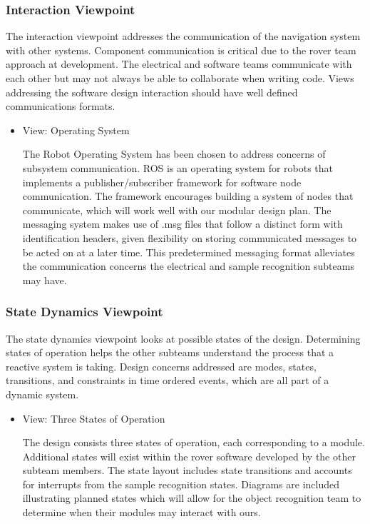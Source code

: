 \documentclass[10pt, oneside,onecolumn]{IEEEtran}
\begin{document}
\begin{titlepage}
\subsubsection{Interaction Viewpoint}

The interaction viewpoint addresses the communication of the navigation system with other systems. Component communication is critical due to the rover team approach at development. The electrical and software teams communicate with each other but may not always be able to collaborate when writing code. Views addressing the software design interaction should have well defined communications formats. 

\begin{itemize}

\item View: Operating System

The Robot Operating System has been chosen to address concerns of subsystem communication. ROS is an operating system for robots that implements a publisher/subscriber framework for software node communication. The framework encourages building a system of nodes that communicate, which will work well with our modular design plan. The messaging system makes use of .msg files that follow a distinct form with identification headers, given flexibility on storing communicated messages to be acted on at a later time. This predetermined messaging format alleviates the communication concerns the electrical and sample recognition subteams may have.
\end{itemize}

\subsubsection{State Dynamics Viewpoint}

The state dynamics viewpoint looks at possible states of the design. Determining states of operation helps the other subteams understand the process that a reactive system is taking. Design concerns addressed are modes, states, transitions, and constraints in time ordered events, which are all part of a dynamic system. 

\begin{itemize}
\item View: Three States of Operation

The design consists three states of operation, each corresponding to a module. Additional states will exist within the rover software developed by the other subteam members. The state layout includes state transitions and accounts for interrupts from the sample recognition states. Diagrams are included illustrating planned states which will allow for the object recognition team to determine when their modules may interact with ours. 


\end{itemize}
\end{titlepage}
\end{document}
